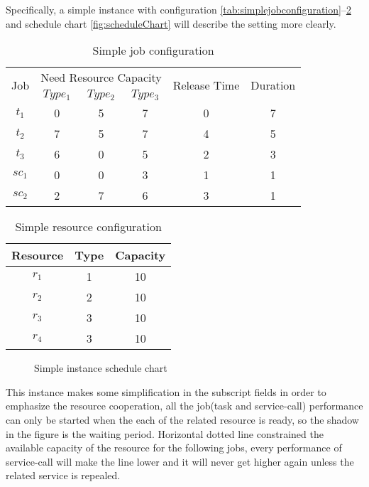 Specifically, a simple instance with configuration \autoref{tab:simplejobconfiguration}--\ref{tab:simpleresourceconfiguration} and schedule chart \autoref{fig:scheduleChart} will describe the setting more clearly. 
\begin{table}[htbp]
  \centering
  \scriptsize
  \caption{Simple job configuration}
    \begin{tabular}{cccccc}
    \toprule
    \multicolumn{1}{c}{\multirow{2}[0]{*}{ Job}} & \multicolumn{3}{c}{Need Resource Capacity} & \multicolumn{1}{c}{\multirow{2}[0]{*}{Release Time}} & \multicolumn{1}{c}{\multirow{2}[0]{*}{Duration}} \\
    \multicolumn{1}{c}{} & $Type_1$ & $Type_2$ & $Type_3$ & \multicolumn{1}{c}{} & \multicolumn{1}{c}{} \\
    \midrule
    $t_1$ & 0     & 5     & 7     & 0     & 7 \\
    $t_2$ & 7     & 5     & 7     & 4     & 5 \\
    $t_3$ & 6     & 0     & 5     & 2     & 3 \\
    $sc_1$ & 0     & 0     & 3    & 1     & 1 \\
    $sc_2$ & 2     & 7     & 6     & 3     & 1 \\
    \bottomrule
    \end{tabular}%
  \label{tab:simplejobconfiguration}%
\end{table}%
\begin{table}[htbp]
  \centering
  \scriptsize
  \caption{Simple resource configuration}
    \begin{tabular}{ccc}
    \toprule
    Resource & Type  & Capacity \\
    \midrule
    $r_1$ & 1     & 10 \\
    $r_2$ & 2     & 10 \\
    $r_3$ & 3     & 10 \\
    $r_4$ & 3     & 10 \\
    \bottomrule
    \end{tabular}%
  \label{tab:simpleresourceconfiguration}%
\end{table}%
\begin{figure}[htbp]
	\centering
	\resizebox{.8\textwidth}{!}{}
	\caption{Simple instance schedule chart}
	\label{fig:scheduleChart}
\end{figure}
This instance makes some simplification in the subscript fields in order to emphasize the resource cooperation, all the job(task and service-call) performance can only be started when the each of the related resource is ready, so the shadow in the figure is the waiting period. Horizontal dotted line constrained the available capacity of the resource for the following jobs, every performance of service-call will make the line lower and it will never get higher again unless the related service is repealed.

